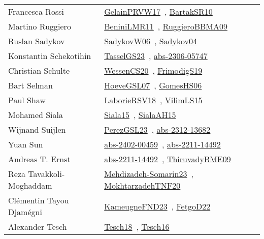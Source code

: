 {\begin{longtable}{p{4cm}p{20cm}}
Francesca Rossi & \href{papers/GelainPRVW17.pdf}{GelainPRVW17}~\cite{GelainPRVW17}, \href{articles/BartakSR10.pdf}{BartakSR10}~\cite{BartakSR10}\\
Martino Ruggiero & \href{articles/BeniniLMR11.pdf}{BeniniLMR11}~\cite{BeniniLMR11}, \href{articles/RuggieroBBMA09.pdf}{RuggieroBBMA09}~\cite{RuggieroBBMA09}\\
Ruslan Sadykov & \href{}{SadykovW06}~\cite{SadykovW06}, \href{papers/Sadykov04.pdf}{Sadykov04}~\cite{Sadykov04}\\
Konstantin Schekotihin & \href{papers/TasselGS23.pdf}{TasselGS23}~\cite{TasselGS23}, \href{articles/abs-2306-05747.pdf}{abs-2306-05747}~\cite{abs-2306-05747}\\
Christian Schulte & \href{papers/WessenCS20.pdf}{WessenCS20}~\cite{WessenCS20}, \href{papers/FrimodigS19.pdf}{FrimodigS19}~\cite{FrimodigS19}\\
Bart Selman & \href{papers/HoeveGSL07.pdf}{HoeveGSL07}~\cite{HoeveGSL07}, \href{papers/GomesHS06.pdf}{GomesHS06}~\cite{GomesHS06}\\
Paul Shaw & \href{articles/LaborieRSV18.pdf}{LaborieRSV18}~\cite{LaborieRSV18}, \href{papers/VilimLS15.pdf}{VilimLS15}~\cite{VilimLS15}\\
Mohamed Siala & \href{articles/Siala15.pdf}{Siala15}~\cite{Siala15}, \href{papers/SialaAH15.pdf}{SialaAH15}~\cite{SialaAH15}\\
Wijnand Suijlen & \href{papers/PerezGSL23.pdf}{PerezGSL23}~\cite{PerezGSL23}, \href{articles/abs-2312-13682.pdf}{abs-2312-13682}~\cite{abs-2312-13682}\\
Yuan Sun & \href{articles/abs-2402-00459.pdf}{abs-2402-00459}~\cite{abs-2402-00459}, \href{articles/abs-2211-14492.pdf}{abs-2211-14492}~\cite{abs-2211-14492}\\
Andreas T. Ernst & \href{articles/abs-2211-14492.pdf}{abs-2211-14492}~\cite{abs-2211-14492}, \href{papers/ThiruvadyBME09.pdf}{ThiruvadyBME09}~\cite{ThiruvadyBME09}\\
Reza Tavakkoli{-}Moghaddam & \href{papers/Mehdizadeh-Somarin23.pdf}{Mehdizadeh-Somarin23}~\cite{Mehdizadeh-Somarin23}, \href{}{MokhtarzadehTNF20}~\cite{MokhtarzadehTNF20}\\
Cl{\'{e}}mentin Tayou Djam{\'{e}}gni & \href{papers/KameugneFND23.pdf}{KameugneFND23}~\cite{KameugneFND23}, \href{articles/FetgoD22.pdf}{FetgoD22}~\cite{FetgoD22}\\
Alexander Tesch & \href{papers/Tesch18.pdf}{Tesch18}~\cite{Tesch18}, \href{papers/Tesch16.pdf}{Tesch16}~\cite{Tesch16}\\

\end{longtable}}
